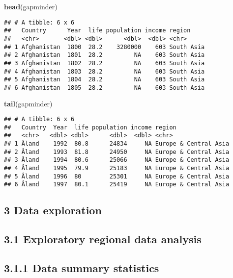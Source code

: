 \documentclass[]{article}
\newenvironment{Shaded}{\begin{snugshade}}{\end{snugshade}}
\newcommand{\KeywordTok}[1]{\textcolor[rgb]{0.13,0.29,0.53}{\textbf{#1}}}
\newcommand{\NormalTok}[1]{#1}
\begin{document}
\begin{Shaded}
\begin{Highlighting}[]
\KeywordTok{head}\NormalTok{(gapminder)}
\end{Highlighting}
\end{Shaded}

\begin{verbatim}
## # A tibble: 6 x 6
##   Country      Year  life population income region    
##   <chr>       <dbl> <dbl>      <dbl>  <dbl> <chr>     
## 1 Afghanistan  1800  28.2    3280000    603 South Asia
## 2 Afghanistan  1801  28.2         NA    603 South Asia
## 3 Afghanistan  1802  28.2         NA    603 South Asia
## 4 Afghanistan  1803  28.2         NA    603 South Asia
## 5 Afghanistan  1804  28.2         NA    603 South Asia
## 6 Afghanistan  1805  28.2         NA    603 South Asia
\end{verbatim}

\begin{Shaded}
\begin{Highlighting}[]
\KeywordTok{tail}\NormalTok{(gapminder)}
\end{Highlighting}
\end{Shaded}

\begin{verbatim}
## # A tibble: 6 x 6
##   Country  Year  life population income region               
##   <chr>   <dbl> <dbl>      <dbl>  <dbl> <chr>                
## 1 Åland    1992  80.8      24834     NA Europe & Central Asia
## 2 Åland    1993  81.8      24950     NA Europe & Central Asia
## 3 Åland    1994  80.6      25066     NA Europe & Central Asia
## 4 Åland    1995  79.9      25183     NA Europe & Central Asia
## 5 Åland    1996  80        25301     NA Europe & Central Asia
## 6 Åland    1997  80.1      25419     NA Europe & Central Asia
\end{verbatim}

\subsection{3 Data exploration}\label{data-exploration}

\subsection{3.1 Exploratory regional data
analysis}\label{exploratory-regional-data-analysis}

\subsection{3.1.1 Data summary
statistics}\label{data-summary-statistics}
\end{document}
